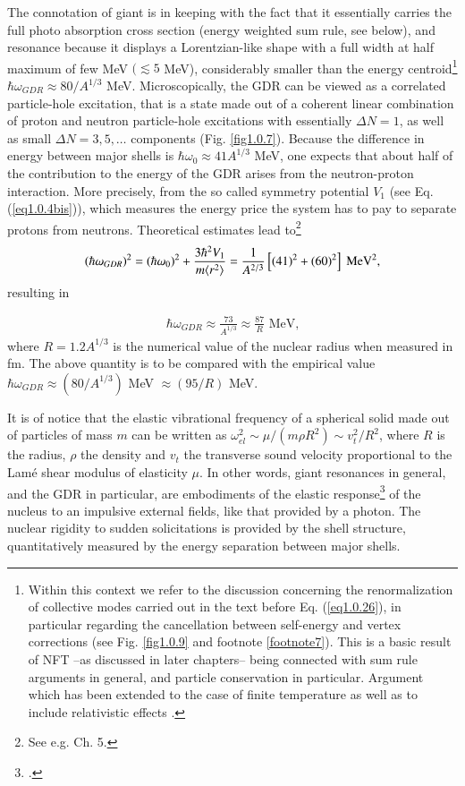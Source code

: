 The connotation of giant is in keeping with the fact that it essentially carries the full photo absorption cross section (energy weighted sum rule, see below), and resonance because it displays a Lorentzian-like shape with a full width at half maximum of few MeV $(\lesssim5$ MeV), considerably  smaller than the energy centroid\footnote{Within this context we refer to the discussion concerning the renormalization of collective modes carried out in the text before Eq. (\ref{eq1.0.26}), in particular regarding the cancellation between self-energy and vertex corrections (see Fig. \ref{fig1.0.9} and footnote \ref{footnote7}). This is a basic result of NFT --as discussed in later chapters-- being connected with sum rule arguments in general, and particle conservation in particular. Argument which has been extended to the case of finite temperature as well as to include relativistic effects \cite{Ward:50,Nambu:60,Bortignon:81,Bertsch:83,Bortignon:98,Litvinova:18,Wibowo:19}.} $\hbar\omega_{GDR}\approx80/A^{1/3}$ MeV. Microscopically, the GDR can be viewed as a correlated particle-hole excitation, that is a state made out of a coherent linear combination of proton and neutron particle-hole excitations with essentially $\Delta N=1$, as well as small $\Delta N=3,5,\dots$ components (Fig. \ref{fig1.0.7}). Because the difference in energy between major shells is $\hbar\omega_0\approx41A^{1/3}$ MeV, one expects that about half of the contribution to the energy of the GDR arises from the neutron-proton interaction. More precisely, from the so called  symmetry potential $V_1$ (see Eq.  (\ref{eq1.0.4bis})), which measures the energy price the system has to pay to separate protons from neutrons. Theoretical estimates lead to\footnote{See e.g. \cite{Bertsch:05} Ch. 5.} 
\begin{align}\label{eq0.1.106}
(\hbar\omega_{GDR})^2=(\hbar\omega_0)^2+\frac{3\hbar^2V_1}{m\langle {r^2} \rangle}=\frac{1}{A^{2/3}}\left[(41)^2+(60)^2\right]\text{ MeV}^2,
\end{align}
resulting in

\begin{align}\label{eq0.1.107}
\hbar\omega_{GDR}\approx\frac{73}{A^{1/3}}\approx\frac{87}{R}\text{ MeV,}
\end{align}
where $R=1.2A^{1/3}$ is the numerical value of the nuclear radius when measured in fm. The above quantity is to be compared with the empirical value $\hbar\omega_{GDR}\approx(80/A^{1/3})$ MeV $\approx(95/R)$ MeV.

It is of notice that the elastic vibrational frequency of a spherical solid made out of particles of mass $m$ can be written as $\omega_{el}^2\sim\mu/(m\rho R^2)\sim v_t^2/R^2$, where $R$ is the radius, $\rho$ the density and $v_t$ the transverse sound velocity proportional to the Lam\'e shear modulus of elasticity $\mu$.
In other words, giant resonances in general, and the GDR in particular, are embodiments of the elastic response\footnote{\cite{Bertsch:05}.} of the nucleus to an impulsive external fields, like that provided by a photon. The nuclear rigidity to sudden solicitations is provided by the shell structure, quantitatively measured by the energy separation between major shells.
